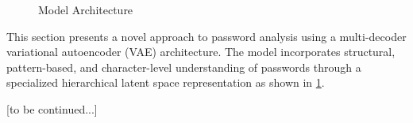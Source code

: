 \begin{figure}
    \caption{Model Architecture}
    \label{fig:hvae-architecture}
\end{figure}
This section presents a novel approach to password analysis using a multi-decoder variational autoencoder (VAE) architecture. The model incorporates structural, pattern-based, and character-level understanding of passwords through a specialized hierarchical latent space representation as shown in \ref{fig:hvae-architecture}.

[to be continued...]

